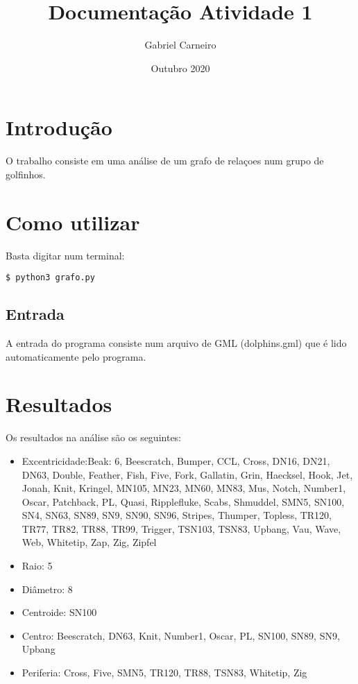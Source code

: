 \documentclass[12pt]{article}
\title{Documentação Atividade 1}
\author{Gabriel Carneiro}
\date{Outubro 2020}
\begin{document}
\setlength{\footskip}{100pt}

\maketitle 

\section{Introdução}
\begin{spacing}{1.5}
	O trabalho consiste em uma análise de um grafo de relaçoes num grupo de golfinhos.

\section{Como utilizar}
	Basta digitar num terminal:
\begin{verbatim}
$ python3 grafo.py
\end{verbatim}

\subsection{Entrada}
	A entrada do programa consiste num arquivo de GML (dolphins.gml) que é lido automaticamente pelo programa.

\end{spacing}

\section{Resultados}
	Os resultados na análise são os seguintes:
\begin{itemize}
	\item 
		Excentricidade:Beak: 6, Beescratch, Bumper, CCL, Cross, DN16, DN21, DN63, Double, Feather, Fish, Five, Fork, Gallatin, Grin, Haecksel, Hook, Jet, Jonah, Knit, Kringel, MN105, MN23, MN60, MN83, Mus, Notch, Number1, Oscar, Patchback, PL, Quasi, Ripplefluke, Scabs, Shmuddel, SMN5, SN100, SN4, SN63, SN89, SN9, SN90, SN96, Stripes, Thumper, Topless, TR120, TR77, TR82, TR88, TR99, Trigger, TSN103, TSN83, Upbang, Vau, Wave, Web, Whitetip, Zap, Zig, Zipfel
	\item Raio: 5
	\item Diâmetro: 8
	\item Centroide: SN100
	\item Centro: Beescratch, DN63, Knit, Number1, Oscar, PL, SN100, SN89, SN9, Upbang
	\item Periferia: Cross, Five, SMN5, TR120, TR88, TSN83, Whitetip, Zig
\end{itemize}
\end{document}
